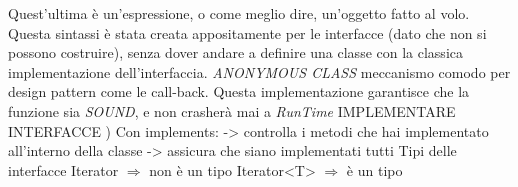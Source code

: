 Quest'ultima è un'espressione, o come meglio dire, un'oggetto fatto al volo. Questa sintassi è stata creata appositamente per le interfacce (dato che non si possono costruire), senza dover andare a definire una classe con la classica implementazione dell'interfaccia. \newline
\textit{ANONYMOUS CLASS} meccanismo comodo per design pattern come le call-back. \newline
Questa implementazione garantisce che la funzione sia \textit{SOUND}, e non crasherà mai a \textit{RunTime}
\newline
IMPLEMENTARE INTERFACCE ) Con implements: \newline
-> controlla i metodi che hai implementato all'interno della classe \newline
-> assicura che siano implementati tutti \newline
Tipi delle interfacce \newline
Iterator $\Rightarrow$ non è un tipo \newline
Iterator<T> $\Rightarrow$ è un tipo \newline

\newpage


